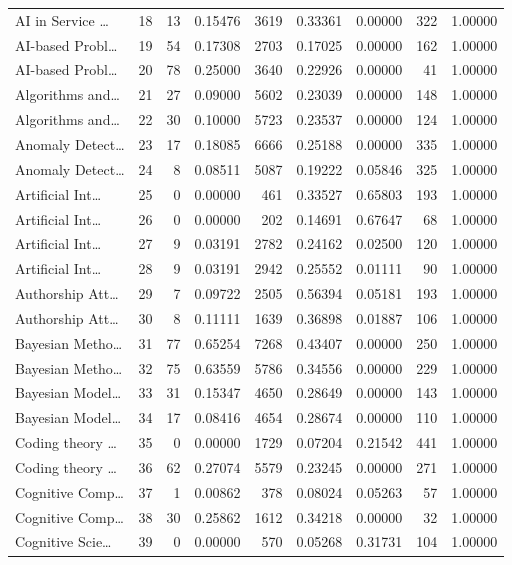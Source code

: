 \begin{table}
\begin{tabular}{lrrrrrrrr}
AI in Service … & 18 & 13 & 0.15476 & 3619 & 0.33361 & 0.00000 & 322 & 1.00000 \\
AI-based Probl… & 19 & 54 & 0.17308 & 2703 & 0.17025 & 0.00000 & 162 & 1.00000 \\
AI-based Probl… & 20 & 78 & 0.25000 & 3640 & 0.22926 & 0.00000 & 41 & 1.00000 \\
Algorithms and… & 21 & 27 & 0.09000 & 5602 & 0.23039 & 0.00000 & 148 & 1.00000 \\
Algorithms and… & 22 & 30 & 0.10000 & 5723 & 0.23537 & 0.00000 & 124 & 1.00000 \\
Anomaly Detect… & 23 & 17 & 0.18085 & 6666 & 0.25188 & 0.00000 & 335 & 1.00000 \\
Anomaly Detect… & 24 & 8 & 0.08511 & 5087 & 0.19222 & 0.05846 & 325 & 1.00000 \\
Artificial Int… & 25 & 0 & 0.00000 & 461 & 0.33527 & 0.65803 & 193 & 1.00000 \\
Artificial Int… & 26 & 0 & 0.00000 & 202 & 0.14691 & 0.67647 & 68 & 1.00000 \\
Artificial Int… & 27 & 9 & 0.03191 & 2782 & 0.24162 & 0.02500 & 120 & 1.00000 \\
Artificial Int… & 28 & 9 & 0.03191 & 2942 & 0.25552 & 0.01111 & 90 & 1.00000 \\
Authorship Att… & 29 & 7 & 0.09722 & 2505 & 0.56394 & 0.05181 & 193 & 1.00000 \\
Authorship Att… & 30 & 8 & 0.11111 & 1639 & 0.36898 & 0.01887 & 106 & 1.00000 \\
Bayesian Metho… & 31 & 77 & 0.65254 & 7268 & 0.43407 & 0.00000 & 250 & 1.00000 \\
Bayesian Metho… & 32 & 75 & 0.63559 & 5786 & 0.34556 & 0.00000 & 229 & 1.00000 \\
Bayesian Model… & 33 & 31 & 0.15347 & 4650 & 0.28649 & 0.00000 & 143 & 1.00000 \\
Bayesian Model… & 34 & 17 & 0.08416 & 4654 & 0.28674 & 0.00000 & 110 & 1.00000 \\
Coding theory … & 35 & 0 & 0.00000 & 1729 & 0.07204 & 0.21542 & 441 & 1.00000 \\
Coding theory … & 36 & 62 & 0.27074 & 5579 & 0.23245 & 0.00000 & 271 & 1.00000 \\
Cognitive Comp… & 37 & 1 & 0.00862 & 378 & 0.08024 & 0.05263 & 57 & 1.00000 \\
Cognitive Comp… & 38 & 30 & 0.25862 & 1612 & 0.34218 & 0.00000 & 32 & 1.00000 \\
Cognitive Scie… & 39 & 0 & 0.00000 & 570 & 0.05268 & 0.31731 & 104 & 1.00000 \\

\end{tabular}
\end{table}
